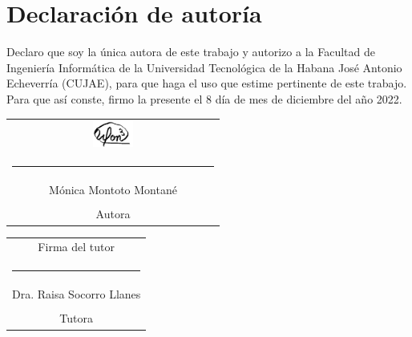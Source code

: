 \chapter*{Declaración de autoría}

Declaro que soy la única autora de este trabajo y autorizo a la Facultad de Ingeniería Informática de la Universidad Tecnológica de la Habana José Antonio Echeverría (CUJAE), para que haga el uso que estime pertinente de este trabajo. Para que así conste, firmo la presente el 8 día de mes de diciembre del año 2022.

\vspace{1.5cm}

\begingroup	
\setlength{\tabcolsep}{10pt} %
\renewcommand{\arraystretch}{0.5} %

\begin{tabular}{c}
	\includegraphics[width=0.2\textwidth]{imagen/firma.png}\\
	\noindent\rule{6cm}{0.4pt} \\
	Mónica Montoto Montané \\
    \\
	Autora
\end{tabular}

\vspace{3cm}

\begin{tabular}{c}
	Firma del tutor  \\
	\noindent\rule{6cm}{0.4pt}\\
	Dra. Raisa Socorro Llanes \\
	\\
	Tutora 
\end{tabular}
\endgroup

